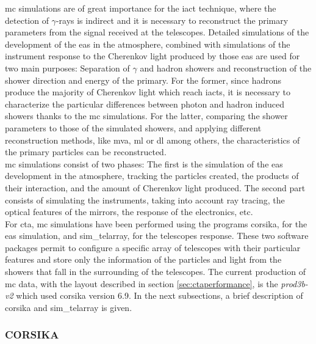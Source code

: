 \documentclass[main.tex]{subfiles}
\begin{document}
\gls{mc} simulations are of great importance for the \gls{iact} technique, where the detection of $\gamma$-rays is indirect and it is necessary to reconstruct the primary parameters from the signal received at the telescopes. Detailed simulations of the development of the \gls{eas} in the atmosphere, combined with simulations of the instrument response to the Cherenkov light produced by those \gls{eas} are used for two main purposes: Separation of $\gamma$ and hadron showers and reconstruction of the shower direction and energy of the primary. For the former, since hadrons produce the majority of Cherenkov light which reach \glspl{iact}, it is necessary to characterize the particular differences between photon and hadron induced showers thanks to the \gls{mc} simulations. For the latter, comparing the shower parameters to those of the simulated showers, and applying different reconstruction methods, like \gls{mva}, \gls{ml} or \gls{dl} among others, the characteristics of the primary particles can be reconstructed.\\
\gls{mc} simulations consist of two phases: The first is the simulation of the \gls{eas} development in the atmosphere, tracking the particles created, the products of their interaction, and the amount of Cherenkov light produced. The second part consists of simulating the instruments, taking into account ray tracing, the optical features of the mirrors, the response of the electronics, etc.\\
For \gls{cta}, \gls{mc} simulations have been performed using the programs \gls{corsika}, for the \gls{eas} simulation, and sim\_telarray, for the telescopes response. These two software packages permit to configure a specific array of telescopes with their particular features and store only the information of the particles and light from the showers that fall in the surrounding of the telescopes. The current production of \gls{mc} data, with the layout described in section \ref{sec:ctaperformance}, is the \textit{prod3b-v2} which used \gls{corsika} version 6.9. In the next subsections, a brief description of \gls{corsika} and sim\_telarray is given.

\subsubsection{CORSIKA} \label{sec:corsika}
\end{document}
